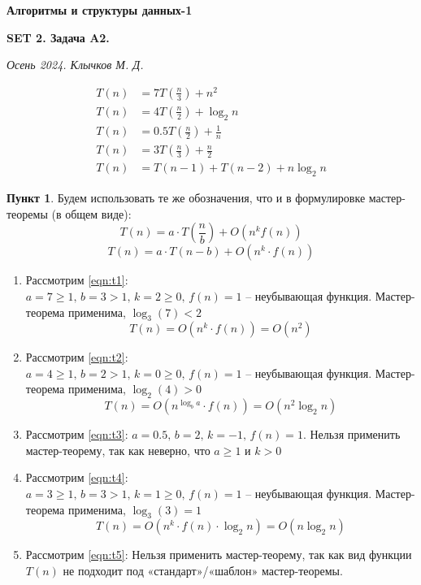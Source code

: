 \documentclass[11pt,a4paper]{scrarticle}
\author{Клычков Максим Дмитриевич}
\theoremstyle{definition}
\newtheorem{subtask}{Пункт}
\begin{document}
\centerline{\textbf{\huge Алгоритмы и структуры данных-1}}
\centerline{\textbf{SET 2. Задача A2.}}
\begin{flushright}
	\emph{Осень 2024. Клычков М. Д.}
\end{flushright}

\begin{align}
	\label{eqn:t1} T(n) & = 7 T\left(\frac{n}{3}\right) + n^2                      \\
	\label{eqn:t2} T(n) & = 4 T\left(\frac{n}{2}\right) + \log_2 n                 \\
	\label{eqn:t3} T(n) & = 0.5 T\left(\frac{n}{2}\right) + \frac{1}{n}            \\
	\label{eqn:t4} T(n) & = 3 T\left(\frac{n}{3}\right) + \frac{n}{2}              \\
	\label{eqn:t5} T(n) & = T\left(n - 1\right) + T\left(n - 2\right) + n \log_2 n
\end{align}

\begin{subtask}
	Будем использовать те же обозначения, что и в формулировке мастер-теоремы (в общем виде):
	$$
		T(n) = a \cdot T\left(\frac{n}{b}\right) + O(n^k f(n))
	$$
	$$
		T(n) = a \cdot T(n - b) + O(n^k \cdot f(n))
	$$

	\begin{enumerate}
		\item Рассмотрим \eqref{eqn:t1}:
		      $a = 7 \geq 1, \, b = 3 > 1, \, k = 2 \geq 0, \, f(n) = 1 \text{ -- неубывающая функция}$. Мастер-теорема применима, $\log_3(7) < 2$
		      $$
			      T(n) = O(n^k \cdot f(n)) = O(n^2)
		      $$
		\item Рассмотрим \eqref{eqn:t2}:
		      $a = 4 \geq 1, \, b = 2 > 1, \, k = 0 \geq 0, \, f(n) = 1 \text{ -- неубывающая функция}$. Мастер-теорема применима, $\log_2(4) > 0$
		      $$
			      T(n) = O(n^{\log_b a} \cdot f(n)) = O(n^2 \log_2 n)
		      $$
		\item Рассмотрим \eqref{eqn:t3}:
		      $a = 0.5, \, b = 2, \, k = -1, \, f(n) = 1$. Нельзя применить мастер-теорему, так как неверно, что $a \geq 1$ и $k > 0$
		\item Рассмотрим \eqref{eqn:t4}:
		      $a = 3 \geq 1, \, b = 3 > 1, \, k = 1 \geq 0, \, f(n) = 1 \text{ -- неубывающая функция}$. Мастер-теорема применима, $\log_3(3) = 1$
		      $$
			      T(n) = O(n^k \cdot f(n) \cdot \log_2 n) = O(n \log_2 n)
		      $$
		\item Рассмотрим \eqref{eqn:t5}:
		      Нельзя применить мастер-теорему, так как вид функции $T(n)$ не подходит под «стандарт»/«шаблон» мастер-теоремы.
	\end{enumerate}
\end{subtask}
\end{document}
